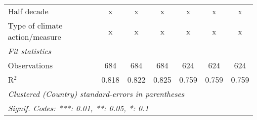 \begin{tabular}{lcccccc}
   Half decade                                        & x       & x             & x             & x             & x             & x\\  
   Type of climate action/measure                     & x       & x             & x             & x             & x             & x\\  
   \midrule \emph{Fit statistics}\\
   Observations                                       & 684     & 684           & 684           & 624           & 624           & 624\\  
   R$^2$                                              & 0.818   & 0.822         & 0.825         & 0.759         & 0.759         & 0.759\\  
   \midrule
   \multicolumn{7}{l}{\emph{Clustered (Country) standard-errors in parentheses}}\\
   \multicolumn{7}{l}{\emph{Signif. Codes: ***: 0.01, **: 0.05, *: 0.1}}\\
\end{tabular}
\par\endgroup


